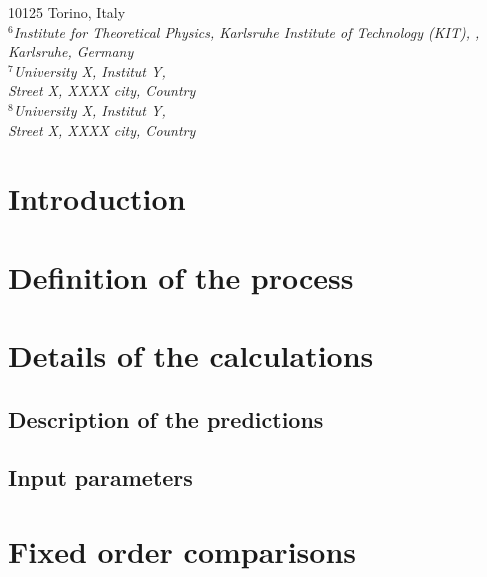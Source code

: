\documentclass[11pt,epsf]{article}
\begin{document}
{{        10125 Torino, %
        Italy}\\[3mm]
{\small\it
$^6$Institute for Theoretical Physics, Karlsruhe Institute of
Technology (KIT), 
,} \\ %
{\small\it Karlsruhe, Germany}\\[3mm]
{\small\it
$^7$University X, %
        Institut Y,} \\ %
{\small\it Street X, \linebreak %
        XXXX city, %
        Country}\\[3mm]
{\small\it
$^8$University X, %
        Institut Y,} \\ %
{\small\it Street X, \linebreak %
        XXXX city, %
        Country}\\[3mm]
        }


\maketitle

\newpage



\section{Introduction}



\section{Definition of the process}

\section{Details of the calculations}

\subsection{Description of the predictions}



\subsection{Input parameters}



\section{Fixed order comparisons}
\end{document}
